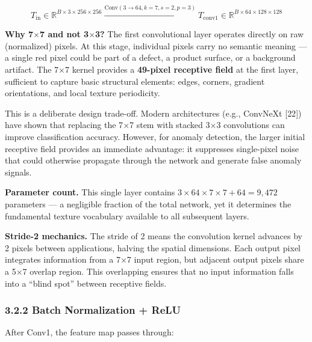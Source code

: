 \documentclass[12pt, a4paper, oneside]{report}
\begin{document}
\[T_{\text{in}} \in \mathbb{R}^{B \times 3 \times 256 \times 256} \xrightarrow{\text{Conv}(3 \to 64, k{=}7, s{=}2, p{=}3)} T_{\text{conv1}} \in \mathbb{R}^{B \times 64 \times 128 \times 128}\]

\textbf{Why 7$\times$7 and not 3$\times$3?} The first convolutional layer operates directly on raw (normalized) pixels. At this stage, individual pixels carry no semantic meaning --- a single red pixel could be part of a defect, a product surface, or a background artifact. The 7$\times$7 kernel provides a \textbf{49-pixel receptive field} at the first layer, sufficient to capture basic structural elements: edges, corners, gradient orientations, and local texture periodicity.

This is a deliberate design trade-off. Modern architectures (e.g., ConvNeXt {[}22{]}) have shown that replacing the 7$\times$7 stem with stacked 3$\times$3 convolutions can improve classification accuracy. However, for anomaly detection, the larger initial receptive field provides an immediate advantage: it suppresses single-pixel noise that could otherwise propagate through the network and generate false anomaly signals.

\textbf{Parameter count.} This single layer contains \(3 \times 64 \times 7 \times 7 + 64 = 9{,}472\) parameters --- a negligible fraction of the total network, yet it determines the fundamental texture vocabulary available to all subsequent layers.

\textbf{Stride-2 mechanics.} The stride of 2 means the convolution kernel advances by 2 pixels between applications, halving the spatial dimensions. Each output pixel integrates information from a 7$\times$7 input region, but adjacent output pixels share a 5$\times$7 overlap region. This overlapping ensures that no input information falls into a ``blind spot'' between receptive fields.

\subsubsection{3.2.2 Batch Normalization + ReLU}\label{batch-normalization-relu}

After Conv1, the feature map passes through:
\end{document}
